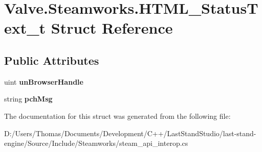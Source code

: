 \hypertarget{structValve_1_1Steamworks_1_1HTML__StatusText__t}{}\section{Valve.\+Steamworks.\+H\+T\+M\+L\+\_\+\+Status\+Text\+\_\+t Struct Reference}
\label{structValve_1_1Steamworks_1_1HTML__StatusText__t}
\subsection*{Public Attributes}
\begin{DoxyCompactItemize}
\item 
\hypertarget{structValve_1_1Steamworks_1_1HTML__StatusText__t_ae6a649741ee30983a8b775d0bf3348dd}{}uint {\bfseries un\+Browser\+Handle}\label{structValve_1_1Steamworks_1_1HTML__StatusText__t_ae6a649741ee30983a8b775d0bf3348dd}

\item 
\hypertarget{structValve_1_1Steamworks_1_1HTML__StatusText__t_a926f7b36e5b6e1dc37f21a7a7c7bb3a9}{}string {\bfseries pch\+Msg}\label{structValve_1_1Steamworks_1_1HTML__StatusText__t_a926f7b36e5b6e1dc37f21a7a7c7bb3a9}

\end{DoxyCompactItemize}


The documentation for this struct was generated from the following file\+:\begin{DoxyCompactItemize}
\item 
D\+:/\+Users/\+Thomas/\+Documents/\+Development/\+C++/\+Last\+Stand\+Studio/last-\/stand-\/engine/\+Source/\+Include/\+Steamworks/steam\+\_\+api\+\_\+interop.\+cs\end{DoxyCompactItemize}

